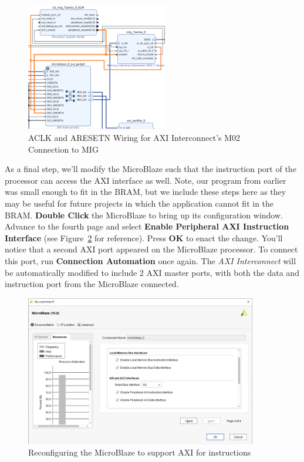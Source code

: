 \documentclass[11pt]{article}
\begin{document}
\begin{figure}[h]
    \centering
    \includegraphics[width=0.55\textwidth]{images/correct_mig_axi_clk_rst_wiring.png}
    \caption{ACLK and ARESETN Wiring for AXI Interconnect's M02 Connection to MIG}
    \label{fig:correct_aclk_aresetn}
\end{figure}

As a final step, we'll modify the MicroBlaze such that the instruction port of the processor can access the AXI interface as well. Note, our program from earlier was small enough to fit in the BRAM, but we include these steps here as they may be useful for future projects in which the application cannot fit in the BRAM. \textbf{Double Click} the MicroBlaze to bring up its configuration window. Advance to the fourth page and select \textbf{Enable Peripheral AXI Instruction Interface} (see Figure~\ref{fig:uB_add_instr_axi} for reference). Press \textbf{OK} to enact the change. You'll notice that a second AXI port appeared on the MicroBlaze processor. To connect this port, run \textbf{Connection Automation} once again. The \textit{AXI Interconnect} will be automatically modified to include 2 AXI master ports, with both the data and instruction port from the MicroBlaze connected.

\begin{figure}[h]
    \centering
    \includegraphics[width=0.9\textwidth]{images/uB_add_instr_axi.png}
    \caption{Reconfiguring the MicroBlaze to support AXI for instructions}
    \label{fig:uB_add_instr_axi}
\end{figure}
\end{document}

